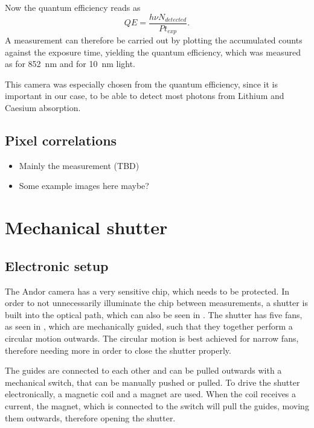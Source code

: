 Now the quantum efficiency reads as
\begin{equation}
QE = \frac{h \nu N_{detected}}{P t_{exp}}.
\end{equation}
A measurement can therefore be carried out by plotting the accumulated counts against the exposure time, yielding the quantum efficiency, which was measured as  for \SI{852}{\nano\meter} and for \SI{10}{\nano\meter} light.

This camera was especially chosen from the quantum efficiency, since it is important in our case, to be able to detect most photons from Lithium and Caesium absorption.

\subsection{Pixel correlations}
\begin{itemize}
	\item Mainly the measurement (TBD)
	\item Some example images here maybe?
\end{itemize}

\section{Mechanical shutter}
\label{sec:shutter}

\subsection{Electronic setup}
\label{subsec:shutter_electronic}

The Andor camera has a very sensitive chip, which needs to be protected. In order to not unnecessarily illuminate the chip between measurements, a shutter is built into the optical path, which can also be seen in . The shutter has five fans, as seen in , which are mechanically guided, such that they together perform a circular motion outwards. The circular motion is best achieved for narrow fans, therefore needing more in order to close the shutter properly.

The guides are connected to each other and can be pulled outwards with a mechanical switch, that can be manually pushed or pulled. To drive the shutter electronically, a magnetic coil and a magnet are used. When the coil receives a current, the magnet, which is connected to the switch will pull the guides, moving them outwards, therefore opening the shutter.

